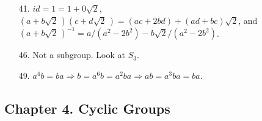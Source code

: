 {\begin{itemize}
\item[41.]
$id = 1 = 1 + 0 \sqrt{2}$, $(a + b \sqrt{2}\, )(c + d \sqrt{2}\, ) = 
(ac + 2bd) + (ad + bc)\sqrt{2}$, and $(a + b \sqrt{2}\, )^{-1} = a/(a^2
-2b^2) - b\sqrt{2}/(a^2 - 2 b^2)$.
 
\item[46.]
Not a subgroup. Look at $S_3$.
 
\item[49.]
$a^4b =ba \Rightarrow b = a^6 b = a^2 b a \Rightarrow ab = a^3 b a =
ba$. 
 
\end{itemize}
}
 
\subsection*{Chapter 4. Cyclic Groups}
 
